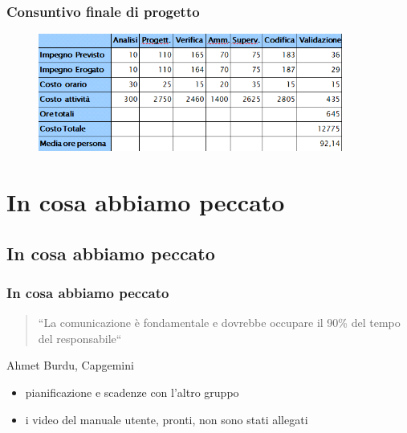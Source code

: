 \begin{frame}
\frametitle{Consuntivo finale di progetto}

\begin{figure}
  \includegraphics[width=10cm]{img/Consuntivo.png}
\end{figure}

\end{frame}


\section{In cosa abbiamo peccato}
\subsection*{In cosa abbiamo peccato}

\begin{frame}

\frametitle{In cosa abbiamo peccato}

\begin{quote}
``La comunicazione è fondamentale e dovrebbe occupare il 90\% del tempo del responsabile``
\end{quote}

\begin{flushright}
Ahmet Burdu, Capgemini
\end{flushright}

\begin{itemize}
\item pianificazione e scadenze con l'altro gruppo
\item i video del manuale utente, pronti, non sono stati allegati
\end{itemize}
\end{frame}


